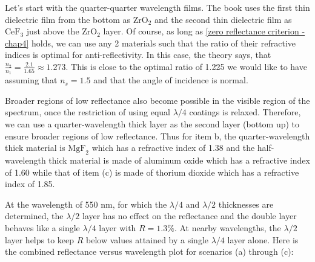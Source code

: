 

Let's start with the quarter-quarter wavelength films. The book uses the first thin dielectric film from the bottom as $\text{ZrO}_2$ and the second thin dielectric film as $\text{CeF}_3$ just above the $\text{ZrO}_2$ layer. Of course, as long as \ref{zero reflectance criterion - chap4} holds, we can use any 2 materials such that the ratio of their refractive indices is optimal for anti-reflectivity. In this case, the theory says, that $\frac{n_2}{n_1} = \frac{2.1}{1.65} \approx 1.273$. This is close to the optimal ratio of 1.225 we would like to have assuming that $n_s = 1.5$ and that the angle of incidence is normal.

Broader regions of low reflectance also become possible in the visible region of the spectrum, once the restriction of using equal $\lambda/4$ coatings is relaxed. Therefore, we can use a quarter-wavelength thick layer as the second layer (bottom up) to ensure broader regions of low reflectance. Thus for item b, the quarter-wavelength thick material is $\text{MgF}_2$ which has a refractive index of 1.38 and the half-wavelength thick material is made of aluminum oxide which has a refractive index of 1.60 while that of item (c) is made of thorium dioxide which has a refractive index of 1.85. %

At the wavelength of 550 nm, for which the $\lambda/4$ and $\lambda/2$ thicknesses are determined, the $\lambda/2$ layer has no effect on the reflectance and the double layer behaves like a single $\lambda/4$ layer with $R = 1.3\%$. At nearby wavelengths, the $\lambda/2$ layer helps to keep $R$ below values attained by a single $\lambda/4$ layer alone. Here is the combined reflectance versus wavelength plot for scenarios (a) through (c):



